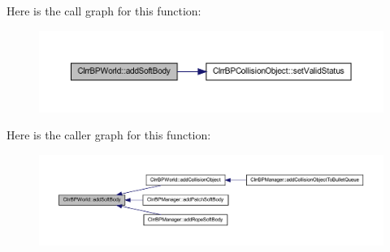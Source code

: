 Here is the call graph for this function:\nopagebreak
\begin{figure}[H]
\begin{center}
\leavevmode
\includegraphics[width=400pt]{class_c_irr_b_p_world_aa0f65ab61bfef47d9e0792141ebc8e35_cgraph}
\end{center}
\end{figure}




Here is the caller graph for this function:\nopagebreak
\begin{figure}[H]
\begin{center}
\leavevmode
\includegraphics[width=400pt]{class_c_irr_b_p_world_aa0f65ab61bfef47d9e0792141ebc8e35_icgraph}
\end{center}
\end{figure}


